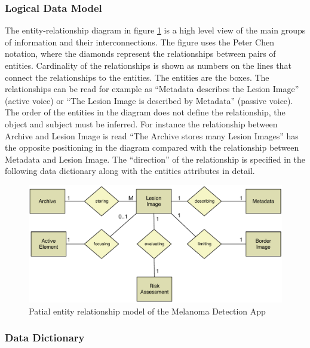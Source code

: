     
        \subsubsection{Logical Data Model}

        The entity-relationship diagram in figure \ref{fig:partial_data_model} is a high level view of the main groups of information and their interconnections. The figure uses the Peter Chen notation, where the diamonds represent the relationships between pairs of entities. Cardinality of the relationships is shown as numbers on the lines that connect the relationships to the entities. The entities are the boxes. The relationships  can be read for example as “Metadata describes the Lesion Image” (active voice) or “The Lesion Image is described by Metadata” (passive voice). The order of the entities in the diagram does not define the relationship, the object and subject must be inferred. For instance the relationship between Archive and Lesion Image is read “The Archive stores many Lesion Images” has the opposite positioning in the diagram compared with the relationship between Metadata and Lesion Image. The “direction” of the relationship is specified in the following data dictionary along with the entities attributes in detail.

            \begin{figure}[H]
                \centering
                \includegraphics[width=\textwidth]{assets/requirements/EntRel.pdf}
                \caption{Patial entity relationship model of the Melanoma Detection App}
                \label{fig:partial_data_model}
            \end{figure}


        \subsubsection{Data Dictionary}

